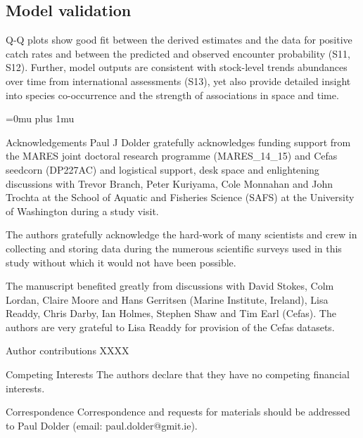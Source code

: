 \documentclass{nature}
\begin{document}
\begin{linenumbers}
\subsection{Model validation}

Q-Q plots show good fit between the derived estimates and the data for positive
catch rates and between the predicted and observed encounter probability (S11,
S12).  Further, model outputs are consistent with stock-level trends abundances
over time from international assessments (S13), yet also provide detailed
insight into species co-occurrence and the strength of associations in space
and time. 

\end{linenumbers}
\newpage
\Urlmuskip=0mu plus 1mu\relax

\small{}


\newpage


\begin{addendum}
 \item [Acknowledgements] Paul J Dolder gratefully acknowledges funding support
	 from the MARES joint doctoral research programme (MARES\_14\_15) and
	 Cefas seedcorn (DP227AC) and logistical support, desk space and
	 enlightening discussions with Trevor Branch, Peter Kuriyama, Cole
	 Monnahan and John Trochta at the School of Aquatic and Fisheries
	 Science (SAFS) at the University of Washington during a study visit.
	 
	 The authors gratefully acknowledge the hard-work of many scientists
	 and crew in collecting and storing data during the numerous scientific
	 surveys used in this study without which it would not have been
	 possible.  
	 
	 The manuscript benefited greatly from discussions with David Stokes,
	 Colm Lordan, Claire Moore and Hans Gerritsen (Marine Institute,
	 Ireland), Lisa Readdy, Chris Darby, Ian Holmes, Stephen Shaw and Tim
	 Earl (Cefas).  The authors are very grateful to Lisa Readdy for
	 provision of the Cefas datasets.

 \item[Author contributions] XXXX

 \item[Competing Interests] The authors declare that they have
	 no competing financial interests.
 \item[Correspondence] Correspondence and requests for materials
 should be addressed to Paul Dolder (email: paul.dolder@gmit.ie).
 \end{addendum}
\end{document}
